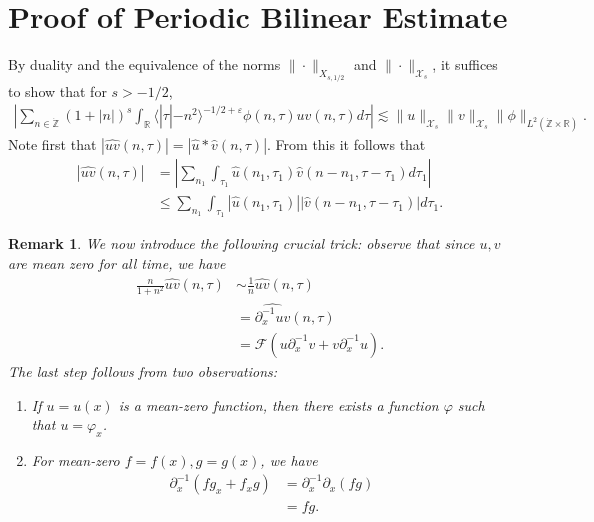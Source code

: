 \documentclass[12pt,reqno]{amsart}
\numberwithin{equation}{section}  %
\newcommand{\rr}{\mathbb{R}}
\newcommand{\zz}{\mathbb{Z}}
\newcommand{\zzdot}{\dot{\zz}}
\newcommand{\wh}{\widehat}
\newcommand{\p}{\partial}
\newcommand{\ee}{\varepsilon}
\newtheorem{remark}[theorem]{Remark}
\begin{document}
\section{Proof of Periodic Bilinear Estimate} 
\label{sec:proof-bilin-est}
By duality and the equivalence of the norms $\| \cdot \|_{X_{s,1/2}}$ and $\| \cdot \|_{\mathcal{X}_{s}}$, it suffices to show that for $s > -1/2$, 
%
\begin{equation}
	\label{duality-est}
	\begin{split}
	|	\sum_{n \in \zzdot}  (1 + |n|)^{s}
	\int_{\rr} \langle | \tau | - n^{2}  \rangle ^{-1/2 + \ee}\phi(n, \tau) \wh{uv}(n, \tau) d \tau | \lesssim \|u\|_{\mathcal{X}_{s}}
    \|v\|_{\mathcal{X}_{s}}
    \|\phi \|_{L^{2}(\zzdot \times \rr)}.
	\end{split}
\end{equation}
Note first that $|\wh{uv}(n, \tau) |  = | \wh{u} *  \wh{v} 
(n, \tau)|$. From this it follows that
%
%
\begin{equation}
	\label{non-lin-rep}
	\begin{split}
		| \wh{uv}(n, \tau)|
    & = | \sum_{n_{1}}  \int_{\tau_{1}}
    \wh{u}\left( n_1,  \tau_1 \right) \wh{v}\left( n - n_1 , \tau - \tau_1   
\right) d \tau_1 |
\\
& \le  \sum_{n_{1}}  \int_{\tau_{1}}
    |\wh{u}\left( n_1,  \tau_1 \right)| |\wh{v}\left( n - n_1 , \tau - \tau_1   
\right)| d \tau_1.
\end{split}
\end{equation}
%
\begin{framed}
\begin{remark}
\label{rem:key-trick}
We now introduce the following crucial trick: observe that since $u, v$ are mean zero for all time, we have 
%
%
%
\begin{equation*}
\begin{split}
\frac{n}{1 + n^{2}} \wh{uv}(n, \tau) 
& \sim \frac{1}{n} \wh{uv}(n, \tau)
\\
& = \wh{\p_{x}^{-1} uv}(n, \tau)
\\
& = \mathcal{F}(u \p_{x}^{-1}v + v \p_{x}^{-1} u).
\end{split}
\end{equation*}
%
The last step follows from two observations: 
\begin{enumerate}
\item{} If $u = u(x)$ is a mean-zero function, then there exists a function $\varphi$ such that $u = \varphi_{x}$.  
\item{} For mean-zero $f=f(x),g=g(x)$, we have
%
%
\begin{equation*}
\begin{split}
\p_{x}^{-1}(fg_{x} + f_{x}g) 
& = \p_{x}^{-1} \p_{x}(fg)
\\
&= fg.
\end{split}
\end{equation*}
%
\end{enumerate}
\end{remark}
\end{framed}
\end{document}
